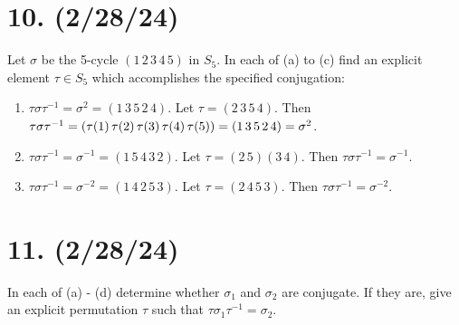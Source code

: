 \documentclass{article}
\begin{document}



\section*{10. (2/28/24)}

Let $\sigma$ be the 5-cycle $(1\, 2\, 3\, 4\, 5)$ in $S_5$. In each of (a) to (c) find an explicit element $\tau \in S_5$ which accomplishes the specified conjugation:

\begin{enumerate}[label=(\alph*), itemsep=0em]
    \item $\tau \sigma \tau^{-1} = \sigma^2 = (1\, 3\, 5\, 2\, 4)$. Let $\tau = (2\, 3\, 5\, 4)$. Then $\tau \sigma \tau^{-1} = \\ (\tau(1)\, \tau(2)\, \tau(3)\, \tau(4)\, \tau(5)) = (1\, 3\, 5\, 2\, 4) = \sigma^2$.
    \item $\tau \sigma \tau^{-1} = \sigma^{-1} = (1\, 5\, 4\, 3\, 2)$. Let $\tau = (2\, 5)(3\, 4)$. Then $\tau \sigma \tau^{-1} = \sigma^{-1}$.
    \item $\tau \sigma \tau^{-1} = \sigma^{-2} = (1\, 4\, 2\, 5\, 3)$. Let $\tau = (2\, 4\, 5\, 3)$. Then $\tau \sigma \tau^{-1} = \sigma^{-2}$.
\end{enumerate}

\section*{11. (2/28/24)}

In each of (a) - (d) determine whether $\sigma_1$ and $\sigma_2$ are conjugate. If they are, give an explicit permutation $\tau$ such that $\tau \sigma_1 \tau^{-1} = \sigma_2$.
\end{document}
